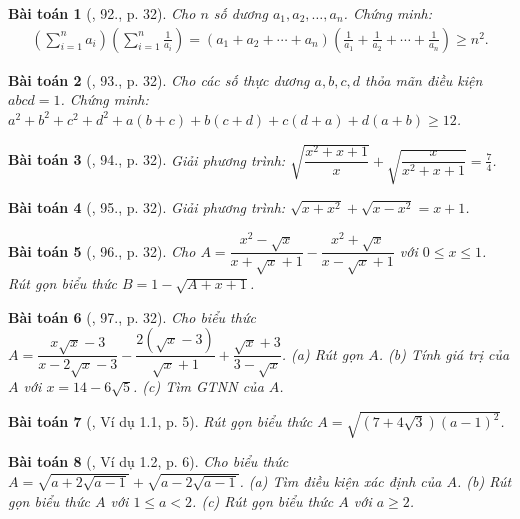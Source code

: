 \documentclass{article}
\newtheorem{baitoan}{Bài toán}
\begin{document}
\begin{baitoan}[\cite{Tuyen_Toan_9}, 92., p. 32]
	Cho $n$ số dương $a_1,a_2,\ldots,a_n$. Chứng minh:
	\begin{align*}
		\left(\sum_{i=1}^n a_i\right)\left(\sum_{i=1}^n \frac{1}{a_i}\right) = (a_1 + a_2 + \cdots + a_n)\left(\frac{1}{a_1} + \frac{1}{a_2} + \cdots + \frac{1}{a_n}\right)\ge n^2.
	\end{align*}
\end{baitoan}

\begin{baitoan}[\cite{Tuyen_Toan_9}, 93., p. 32]
	Cho các số thực dương $a,b,c,d$ thỏa mãn điều kiện $abcd = 1$. Chứng minh: $a^2 + b^2 + c^2 + d^2+ a(b + c) + b(c + d) + c(d + a) + d(a + b)\ge12$.
\end{baitoan}

\begin{baitoan}[\cite{Tuyen_Toan_9}, 94., p. 32]
	Giải phương trình: $\sqrt{\dfrac{x^2 + x + 1}{x}} + \sqrt{\dfrac{x}{x^2 + x + 1}} = \frac{7}{4}$.
\end{baitoan}

\begin{baitoan}[\cite{Tuyen_Toan_9}, 95., p. 32]
	Giải phương trình: $\sqrt{x + x^2} + \sqrt{x - x^2} = x + 1$.
\end{baitoan}

\begin{baitoan}[\cite{Tuyen_Toan_9}, 96., p. 32]
	Cho $A = \dfrac{x^2 - \sqrt{x}}{x + \sqrt{x} + 1} - \dfrac{x^2 + \sqrt{x}}{x - \sqrt{x} + 1}$ với $0\le x\le 1$. Rút gọn biểu thức $B = 1 - \sqrt{A + x + 1}$.
\end{baitoan}

\begin{baitoan}[\cite{Tuyen_Toan_9}, 97., p. 32]
	Cho biểu thức $A = \dfrac{x\sqrt{x} - 3}{x - 2\sqrt{x} - 3} - \dfrac{2(\sqrt{x} - 3)}{\sqrt{x} + 1} + \dfrac{\sqrt{x} + 3}{3 - \sqrt{x}}$. (a) Rút gọn $A$. (b) Tính giá trị của $A$ với $x = 14 - 6\sqrt{5}$. (c) Tìm GTNN của $A$.
\end{baitoan}

\begin{baitoan}[\cite{TLCT_THCS_Toan_9_dai_so}, Ví dụ 1.1, p. 5]
	Rút gọn biểu thức $A = \sqrt{(7 + 4\sqrt{3})(a - 1)^2}$.
\end{baitoan}

\begin{baitoan}[\cite{TLCT_THCS_Toan_9_dai_so}, Ví dụ 1.2, p. 6]
	Cho biểu thức $A = \sqrt{a + 2\sqrt{a - 1}} + \sqrt{a - 2\sqrt{a - 1}}$. (a) Tìm điều kiện xác định của $A$. (b) Rút gọn biểu thức $A$ với $1\le a < 2$. (c) Rút gọn biểu thức $A$ với $a\ge2$.
\end{baitoan}
\end{document}
